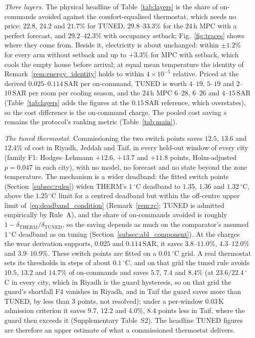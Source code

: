 \documentclass[3p,twocolumn,number]{elsarticle}
\newcommand{\SAR}{\text{SAR}}
\begin{document}
\emph{Three layers.} The physical headline of Table~\ref{tab:layers} is the share of on-commands avoided against the comfort-equalised thermostat, which needs no price: $22.8$, $24.2$ and $21.7\%$ for TUNED, $29.8$--$33.3\%$ for the $24\,$h MPC with a perfect forecast, and $29.2$--$42.3\%$ with occupancy setback; Fig.~\ref{fig:traces} shows where they come from. Beside it, electricity is about unchanged: within $\pm1.2\%$ for every arm without setback and up to $+3.3\%$ for MPC with setback, which cools the empty house before arrival; at equal mean temperature the identity of Remark~\ref{rem:energy_identity} holds to within $4\times10^{-5}$ relative. Priced at the derived $0.025$--$0.114\,\SAR$ per on-command, TUNED is worth $4$--$19$, $5$--$19$ and $2$--$10\,\SAR$ per room per cooling season, and the $24\,$h MPC $6$--$28$, $6$--$26$ and $4$--$15\,\SAR$ (Table~\ref{tab:layers} adds the figures at the $0.15\,\SAR$ reference, which overstates), so the cost difference is the on-command charge. The pooled cost saving $s$ remains the protocol's ranking metric (Table~\ref{tab:main}).



\emph{The tuned thermostat.} Commissioning the two switch points saves $12.5$, $13.6$ and $12.4\%$ of cost in Riyadh, Jeddah and Taif, in every held-out window of every city (family F1: Hodges--Lehmann $+12.6$, $+13.7$ and $+11.8$ points, Holm-adjusted $p=0.047$ in each city), with no model, no forecast and no state beyond the zone temperature. The mechanism is a wider deadband: the fitted switch points (Section~\ref{subsec:rules}) widen THERM's $1\,^\circ$C deadband to $1.35$, $1.36$ and $1.32\,^\circ$C, above the $1.25\,^\circ$C limit for a centred deadband but within the off-centre upper limit of~\eqref{eq:deadband_condition} (Remark~\ref{rem:rc}; TUNED is admitted empirically by Rule~A), and the share of on-commands avoided is roughly $1-\delta_{\mathrm{THERM}}/\delta_{\mathrm{TUNED}}$, so the saving depends as much on the comparator's assumed $1\,^\circ$C deadband as on tuning (Section~\ref{subsec:abl_component}). At the charges the wear derivation supports, $0.025$ and $0.114\,\SAR$, it saves $3.8$--$11.0\%$, $4.3$--$12.0\%$ and $3.9$--$10.9\%$. These switch points are fitted on a $0.01\,^\circ$C grid. A real thermostat sets its thresholds in steps of about $0.1\,^\circ$C, and on that grid the tuned rule avoids $10.5$, $13.2$ and $14.7\%$ of on-commands and saves $5.7$, $7.4$ and $8.4\%$ (at $23.6/22.4\,^\circ$C in every city, which in Riyadh is the guard hysteresis, so on that grid the guard's shortfall F4 vanishes in Riyadh, and in Taif the guard saves more than TUNED, by less than $3$ points, not resolved); under a per-window $0.03\,$K admission criterion it saves $9.7$, $12.2$ and $4.0\%$, $8.4$ points less in Taif, where the guard then exceeds it (Supplementary Table~S2). The headline TUNED figures are therefore an upper estimate of what a commissioned thermostat delivers.
\end{document}
